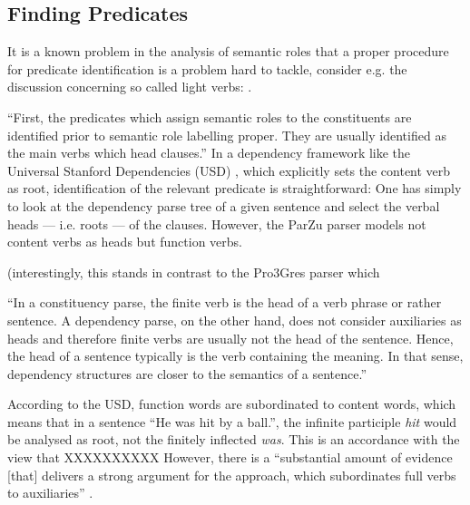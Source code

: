 \begin{landscape}\centering
\end{landscape}

\subsection{Finding Predicates}

It is a known problem in the analysis of semantic roles that a proper procedure for predicate
identification is a problem hard to tackle, consider e.g. the discussion concerning so called
light verbs: \cite{wittenberg2016light}.

``First, the predicates which assign semantic roles to the constituents are identified prior
to semantic role labelling proper. They are usually identified as the main verbs which head
clauses.'' \citep[p.~74]{samardzic2013dynamics} In a dependency framework like the Universal
Stanford Dependencies (USD) \citep{de2014universal}, which explicitly sets the content
verb as root, identification of the relevant predicate is straightforward: One has simply
to look at the dependency parse tree of a given sentence and select the verbal heads ---
i.e. roots --- of the clauses.  However, the ParZu parser models not content verbs as heads
but function verbs.

(interestingly, this stands in contrast to the Pro3Gres parser \citep{schneider2008hybrid} which

``In a constituency parse, the finite verb is the head of a verb phrase or rather sentence.
A dependency parse, on the other hand, does not consider auxiliaries as heads and therefore
finite verbs are usually not the head of the sentence.  Hence, the head of a sentence typically
is the verb containing the meaning.  In that sense, dependency structures are closer to the
semantics of a sentence.'' \citep[p.~6f.]{aepli2018parsing}

According to the USD, function words are subordinated to content words, which means that
in a sentence ``He was hit by a ball.'', the infinite participle \textit{hit} would be
analysed as root, not the finitely inflected \textit{was}.  This is an accordance with the
view that XXXXXXXXXX However, there is a ``substantial amount of evidence [that] delivers a
strong argument for the \textelp{} approach, which subordinates full verbs to auxiliaries''
\cite{gross2015dependency}.

